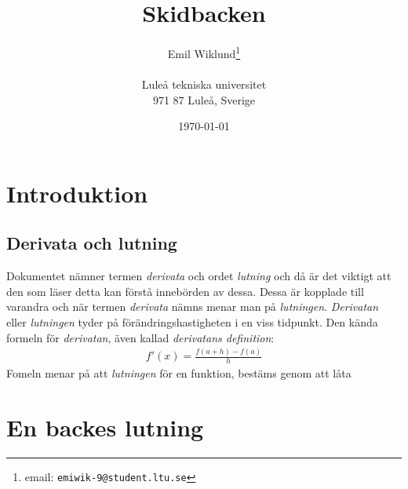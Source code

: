 \documentclass[a4paper,12pt]{article}
\title{Skidbacken}
\author{Emil Wiklund\thanks{email: \texttt{emiwik-9@student.ltu.se}}\\  
        ~ \\
        Luleå tekniska universitet \\ 
        971 87 Luleå, Sverige}
\date{\today}
\begin{document}
\linenumbers


\maketitle


\begin{abstract}

   
\end{abstract}


\section{Introduktion}
\label{sec:introduktion}





\subsection{Derivata och lutning}


Dokumentet nämner termen \emph{derivata} och ordet \emph{lutning} och då är det viktigt att den som läser detta kan förstå innebörden av dessa. Dessa är kopplade till varandra och när termen \emph{derivata }nämns menar man på \emph{lutningen}. \emph{Derivatan} eller \emph{lutningen} tyder på förändringshastigheten i en viss tidpunkt. Den kända formeln för \emph{derivatan}, även kallad \emph{derivatans definition}: 
%
\begin{align*}
  f'(x)=\frac{f(a+h)-f(a)}{h}
\end{align*}
%
Fomeln menar på att \emph{lutningen} för en funktion, bestäms genom att låta 


\newpage
\section{En backes lutning}
\label{sec:uppg1}
\end{document}
